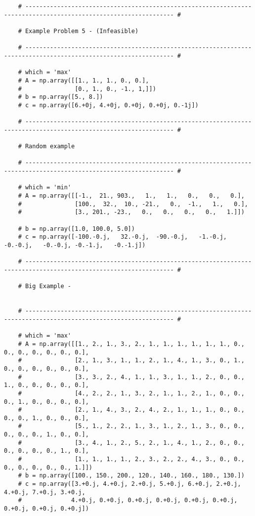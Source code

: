\documentclass[letterpaper, a4paper]{article}
\begin{document}
\begin{verbatim}
    # ---------------------------------------------------------------------------------------------------------------- #

    # Example Problem 5 - (Infeasible)

    # ---------------------------------------------------------------------------------------------------------------- #

    # which = 'max'
    # A = np.array([[1., 1., 1., 0., 0.],
    #               [0., 1., 0., -1., 1,]])
    # b = np.array([5., 8.])
    # c = np.array([6.+0j, 4.+0j, 0.+0j, 0.+0j, 0.-1j])

    # ---------------------------------------------------------------------------------------------------------------- #

    # Random example

    # ---------------------------------------------------------------------------------------------------------------- #

    # which = 'min'
    # A = np.array([[-1.,  21., 903.,   1.,   1.,   0.,   0.,   0.],
    #               [100.,  32.,  10., -21.,   0.,  -1.,   1.,   0.],
    #               [3., 201., -23.,   0.,   0.,   0.,   0.,   1.]])

    # b = np.array([1.0, 100.0, 5.0])
    # c = np.array([-100.-0.j,   32.-0.j,  -90.-0.j,   -1.-0.j,   -0.-0.j,   -0.-0.j, -0.-1.j,   -0.-1.j])

    # ---------------------------------------------------------------------------------------------------------------- #

    # Big Example -


    # ---------------------------------------------------------------------------------------------------------------- #

    # which = 'max'
    # A = np.array([[1., 2., 1., 3., 2., 1., 1., 1., 1., 1., 1., 0., 0., 0., 0., 0., 0., 0.],
    #               [2., 1., 3., 1., 1., 2., 1., 4., 1., 3., 0., 1., 0., 0., 0., 0., 0., 0.],
    #               [3., 3., 2., 4., 1., 1., 3., 1., 1., 2., 0., 0., 1., 0., 0., 0., 0., 0.],
    #               [4., 2., 2., 1., 3., 2., 1., 1., 2., 1., 0., 0., 0., 1., 0., 0., 0., 0.],
    #               [2., 1., 4., 3., 2., 4., 2., 1., 1., 1., 0., 0., 0., 0., 1., 0., 0., 0.],
    #               [5., 1., 2., 2., 1., 3., 1., 2., 1., 3., 0., 0., 0., 0., 0., 1., 0., 0.],
    #               [3., 4., 1., 2., 5., 2., 1., 4., 1., 2., 0., 0., 0., 0., 0., 0., 1., 0.],
    #               [1., 1., 1., 1., 2., 3., 2., 2., 4., 3., 0., 0., 0., 0., 0., 0., 0., 1.]])
    # b = np.array([100., 150., 200., 120., 140., 160., 180., 130.])
    # c = np.array([3.+0.j, 4.+0.j, 2.+0.j, 5.+0.j, 6.+0.j, 2.+0.j, 4.+0.j, 7.+0.j, 3.+0.j,
    #              4.+0.j, 0.+0.j, 0.+0.j, 0.+0.j, 0.+0.j, 0.+0.j, 0.+0.j, 0.+0.j, 0.+0.j])


\end{verbatim}
\end{document}
